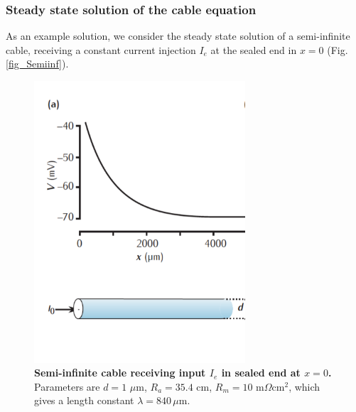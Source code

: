 \begin{itemize}
\begin{itemize}
\subsubsection{Steady state solution of the cable equation}
As an example solution, we consider the steady state solution of a semi-infinite cable, receiving a constant current injection $I_e$ at the sealed end in $x=0$ (Fig. \ref{fig_Semiinf}).

\begin{figure}[!ht]
\begin{center}
\includegraphics[width=0.7\textwidth]{Fig02/Semiinf.png}
\end{center}
\caption{\textbf{Semi-infinite cable receiving input $I_e$ in sealed end at $x=0$.} Parameters are $d = 1$ $\mu$m, $R_a=35.4$ cm, $R_m = 10$ m$\Omega$cm$^2$, which gives a length constant $\lambda = 840\, \mu$m. }
\label{fig:Semiinf}
\end{figure}


\end{itemize}
\end{itemize}
